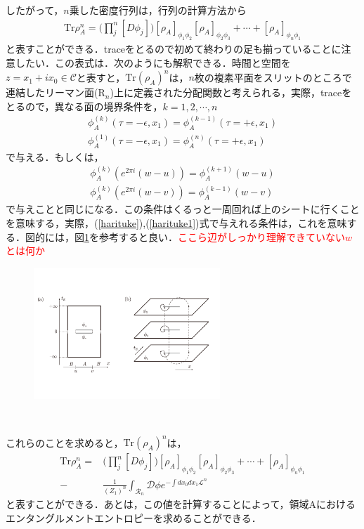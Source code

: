 したがって，$n$乗した密度行列は，行列の計算方法から
\begin{align}
  \mathrm{Tr}\rho_{A}^{n}=\biggl(\prod^{n}_{j}[D\phi_{j}]\biggr)[\rho_{A}]_{\phi_1\phi_2}[\rho_{A}]_{\phi_2\phi_3}+\cdots+[\rho_{A}]_{\phi_n\phi_1}
\end{align}
と表すことができる．traceをとるので初めて終わりの足も揃っていることに注意したい．この表式は．次のようにも解釈できる．時間と空間を$z=x_1+ix_0 \in \mathcal{C}$と表すと，$\mathrm{Tr}(\rho_A)^n$は，$n$枚の複素平面をスリットのところで連結したリーマン面($\mathrm{R}_n$)上に定義された分配関数と考えられる，実際，traceをとるので，異なる面の境界条件を，$k=1,2,\cdots,n$
\begin{align}
  \label{harituke}
  \phi_{A}^{(k)}(\tau=-\epsilon,x_1)=\phi_{A}^{(k-1)}(\tau=+\epsilon,x_1)\\
  \label{harituke1}
  \phi_{A}^{(1)}(\tau=-\epsilon,x_1)=\phi_{A}^{(n)}(\tau=+\epsilon,x_1)
\end{align}
で与える．もしくは，
\begin{align}
  \phi_{A}^{(k)}(e^{2\pi i}(w-u))=\phi_{A}^{(k+1)}(w-u)\\
  \phi_{A}^{(k)}(e^{2\pi i}(w-v))=\phi_{A}^{(k-1)}(w-v)
\end{align}
で与えことと同じになる．この条件はくるっと一周回れば上のシートに行くことを意味する，実際，(\ref{harituke}),(\ref{harituke1})式で与えれる条件は，これを意味する．図的には，図\ref{replica00}を参考すると良い．\textcolor{red}{ここら辺がしっかり理解できていない$w$とは何か}
\begin{figure}[H]
\begin{center}
  \includegraphics[width=7cm,angle=270]{replica.pdf}
  　　　\caption{}
  　　\label{replica00}
\end{center}
\end{figure}

これらのことを求めると，$\mathrm{Tr}(\rho_A)^n$は，
\begin{align}
  \mathrm{Tr}\rho_{A}^{n}=&\biggl(\prod^{n}_{j}[D\phi_{j}]\biggr)[\rho_{A}]_{\phi_1\phi_2}[\rho_{A}]_{\phi_2\phi_3}+\cdots+[\rho_{A}]_{\phi_n\phi_1}\\
  -&\frac{1}{(Z_1)^n}\int_{\mathcal{R}_n}\mathcal{D}\phi e^{-\int dx_0dx_1\mathcal{L}^{n}}
\end{align}
と表すことができる．あとは，この値を計算することによって，領域Aにおけるエンタングルメントエントロピーを求めることができる．


